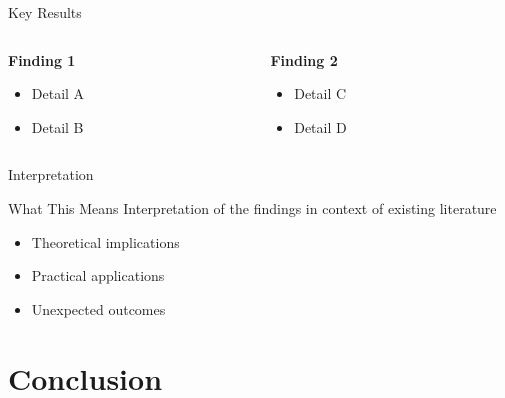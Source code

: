 \documentclass[
  12pt,
  aspectratio=169,  %
  t,                %
  ignorenonframetext %
]{beamer}
\begin{document}
\begin{frame}{Key Results}

  \begin{columns}[t]
    \begin{column}{0.5\textwidth}
      \textbf{Finding 1}
      \begin{itemize}
        \item Detail A
        \item Detail B
      \end{itemize}
    \end{column}

    \begin{column}{0.5\textwidth}
      \textbf{Finding 2}
      \begin{itemize}
        \item Detail C
        \item Detail D
      \end{itemize}
    \end{column}
  \end{columns}

\end{frame}

\begin{frame}{Interpretation}

  \begin{block}{What This Means}
    Interpretation of the findings in context of existing literature
  \end{block}

  \begin{itemize}
    \item Theoretical implications
    \item Practical applications
    \item Unexpected outcomes
  \end{itemize}

\end{frame}

\section{Conclusion}
\end{document}
